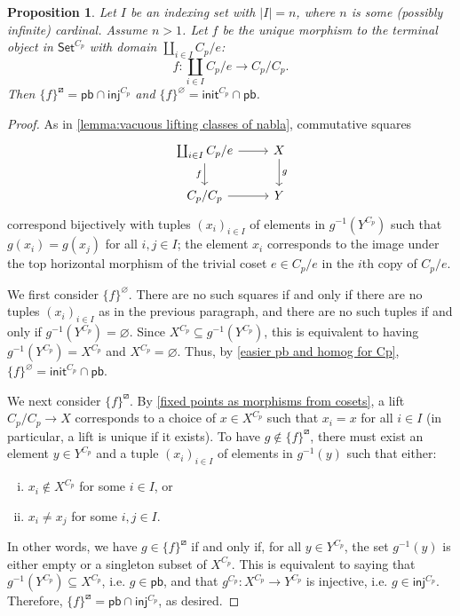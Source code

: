 \documentclass{amsart}
\renewcommand\emptyset\varnothing
\newcommand{\Set}{\mathsf{Set}}
\newcommand{\CpSet}{\Set^{C_p}}
\newcommand{\rlp}[1]{{#1}^{\boxslash}}
\newcommand{\inj}{\mathsf{inj}}
\newcommand{\init}{\mathsf{init}}
\newcommand{\pb}{\mathsf{pb}}
\numberwithin{equation}{section}
\newtheorem{proposition}[equation]{Proposition}
\theoremstyle{definition}
\begin{document}
\begin{proposition}
	\label{n>1 m=0 in table 3}
	Let $I$ be an indexing set with $|I| = n$, where $n$ is some (possibly infinite) cardinal. Assume $n > 1$. Let $f$ be the unique morphism to the terminal object in $\CpSet$ with domain $\coprod_{i \in I} C_p/e$:
	\[
		f \colon \coprod_{i \in I} C_p/e \to C_p/C_p.
	\]
	Then $\rlp{\{f\}} = \pb \cap \inj^{C_p}$ and $\{f\}^\emptyset = \init^{C_p} \cap \pb$.
\end{proposition}

\begin{proof}
	As in \cref{lemma:vacuous lifting classes of nabla}, commutative squares
	\[
		\begin{tikzcd}
			\coprod_{i \in I} C_p/e \ar[d, "f"'] \ar[r] & X \ar[d, "g"] \\
			C_p / C_p \ar[r] & Y
		\end{tikzcd}
	\]
	correspond bijectively with tuples $(x_i)_{i \in I}$ of elements in $g^{-1}(Y^{C_p})$ such that $g(x_i) = g(x_j)$ for all $i, j \in I$; the element $x_i$ corresponds to the image under the top horizontal morphism of the trivial coset $e \in C_p/e$ in the $i$th copy of $C_p/e$.

	We first consider $\{f\}^\emptyset$. There are no such squares if and only if there are no tuples $(x_i)_{i \in I}$ as in the previous paragraph, and there are no such tuples if and only if $g^{-1}(Y^{C_p}) = \emptyset$.
		Since $X^{C_p} \subseteq g^{-1}(Y^{C_p})$, this is equivalent to having $g^{-1}(Y^{C_p}) = X^{C_p}$ and $X^{C_p} = \emptyset$. Thus, by \cref{easier pb and homog for Cp}, $\{f\}^\emptyset = \init^{C_p} \cap \pb$.

	We next consider $\rlp{\{f\}}$. By \cref{fixed points as morphisms from cosets}, a lift $C_p/C_p \to X$ corresponds to a choice of $x \in X^{C_p}$ such that $x_i = x$ for all $i \in I$ (in particular, a lift is unique if it exists). To have $g \notin \rlp{\{f\}}$, there must exist an element $y \in Y^{C_p}$ and a tuple $(x_i)_{i \in I}$ of elements in $g^{-1}(y)$ such that either:
		\begin{enumerate}[(i)]
			\item $x_i \notin X^{C_p}$ for some $i \in I$, or
			\item $x_i \neq x_j$ for some $i, j \in I$.
		\end{enumerate}
		In other words, we have $g \in \rlp{\{f\}}$ if and only if, for all $y \in Y^{C_p}$, the set $g^{-1}(y)$ is either empty or a singleton subset of $X^{C_p}$. This is equivalent to saying that $g^{-1}(Y^{C_p}) \subseteq X^{C_p}$, i.e. $g \in \pb$, and that $g^{C_p} \colon X^{C_p} \to Y^{C_p}$ is injective, i.e. $g \in \inj^{C_p}$. Therefore, $\rlp{\{f\}} = \pb \cap \inj^{C_p}$, as desired.
\end{proof}
\end{document}
